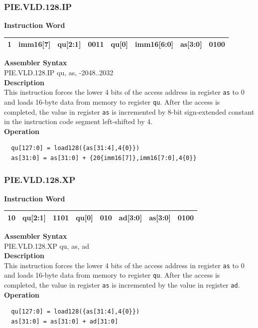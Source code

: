 \newpage
\subsubsection{PIE.VLD.128.IP}\label{instruction:PIEVLD128IP}
\setlength\tabcolsep{6pt}
\textbf{Instruction Word} \\
\begin{tabular}{|c|c|c|c|c|c|c|c|}
	\hline
	1 & imm16[7] & qu[2:1] & 0011 & qu[0] & imm16[6:0] & as[3:0] & 0100 \\
	\hline
\end{tabular}

\textbf{Assembler Syntax} \\
PIE.VLD.128.IP qu, as, -2048..2032 \\
\textbf{Description} \\
This instruction forces the lower 4 bits of the access address in register \lstinline{as} to 0 and loads 16-byte data from memory to register \lstinline{qu}. After the access is completed, the value in register \lstinline{as} is incremented by 8-bit sign-extended constant in the instruction code segment left-shifted by 4.\\
\textbf{Operation}
\begin{lstlisting}
  qu[127:0] = load128({as[31:4],4{0}})
  as[31:0] = as[31:0] + {20{imm16[7]},imm16[7:0],4{0}}
\end{lstlisting}

\newpage
\subsubsection{PIE.VLD.128.XP}\label{instruction:PIEVLD128XP}
\setlength\tabcolsep{6pt}
\textbf{Instruction Word} \\
\begin{tabular}{|c|c|c|c|c|c|c|c|}
	\hline
	10 & qu[2:1] & 1101 & qu[0] & 010 & ad[3:0] & as[3:0] & 0100 \\
	\hline
\end{tabular}

\textbf{Assembler Syntax} \\
PIE.VLD.128.XP qu, as, ad \\
\textbf{Description} \\
This instruction forces the lower 4 bits of the access address in register \lstinline{as} to 0 and loads 16-byte data from memory to register \lstinline{qu}. After the access is completed, the value in register \lstinline{as} is incremented by the value in register \lstinline{ad}.\\
\textbf{Operation}
\begin{lstlisting}
  qu[127:0] = load128({as[31:4],4{0}})
  as[31:0] = as[31:0] + ad[31:0]
\end{lstlisting}

